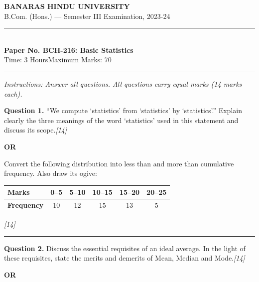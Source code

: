 \documentclass[11pt,a4paper]{article}
\newcommand{\pts}[1]{\hfill   \textit{[#1]}}
\begin{document}
\begin{center}
  {\large\bfseries BANARAS HINDU UNIVERSITY}\\[2pt]
  {\normalsize B.Com. (Hons.) --- Semester III Examination, 2023-24}\\[6pt]
  \rule{0.8\linewidth}{0.5pt}\\[6pt]
  {\large\bfseries Paper No. BCH-216: Basic Statistics}\\[4pt]
  {\normalsize Time: 3 Hours\hfill Maximum Marks: 70}
\end{center}

\rule{\linewidth}{0.4pt}

\smallskip



\noindent   \textit{Instructions: Answer all questions. All questions carry equal marks (14 marks each).}

\bigskip




\noindent   \textbf{Question 1.}
``We compute `statistics' from `statistics' by `statistics'.'' Explain clearly the three meanings of the word `statistics' used in this statement and discuss its scope.\pts{14}

\centerline{   \textbf{OR}}

Convert the following distribution into less than and more than cumulative frequency. Also draw its ogive:


\begin{center}
\small

\begin{tabular}{|l|c|c|c|c|c|}
\hline
   \textbf{Marks} & 0--5 & 5--10 & 10--15 & 15--20 & 20--25 \\
\hline
   \textbf{Frequency} & 10 & 12 & 15 & 13 & 5 \\
\hline
\end{tabular}
\end{center}\pts{14}

\medskip\rule{\linewidth}{0.2pt}




\noindent   \textbf{Question 2.}
Discuss the essential requisites of an ideal average. In the light of these requisites, state the merits and demerits of Mean, Median and Mode.\pts{14}

\centerline{   \textbf{OR}}
\end{document}
